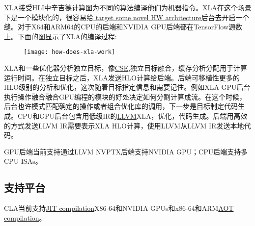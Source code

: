 XLA接受HLI中辛吉德计算图为不同的算法编译他们为机器指令。XLA在这个场景下是一个模块化的，很容易给\href{https://www.tensorflow.org/performance/xla/developing_new_backend}{ target some novel HW architecture}后台去开启一个缝。对于X64和ARM64的CPU的后端和NVIDIA GPU后端都在TensorFlow源数上。下面的图显示了XLA的编译过程:
\begin{center}
\begin{figure}[h]
\texttt{[image: how-does-xla-work]}
\end{figure}
\end{center}
XLA和一些优化器分析独立目标，像\href{https://en.wikipedia.org/wiki/Common_subexpression_elimination}{CSE},独立目标融合，缓存分析分配用于计算运行时间。在独立目标之后，XLA发送HLO计算给后端。后端可移植性更多的HLO级别的分析和优化，这次随着目标指定信息和需要记住。例如XLA GPU后台执行操作融合融合GPU编程的模块的好处决定如何分割计算成流。在这个时候，后台也许模式匹配确定的操作或者组合优化库的调用，下一步是目标制定代码生成。CPU和GPU后台包含用低级IR的\href{http://llvm.org/}{LLVM}XLA，优化，代码生成。后端用高效的方式发送LLVM IR需要表示XLA HLO计算，使用LLVM从LLVM IR发送本地代码。

GPU后端当前支持通过LLVM NVPTX后端支持NVIDIA GPU；CPU后端支持多CPU ISAs。
\subsection{支持平台}
CLA当前支持\href{https://www.tensorflow.org/performance/xla/jit}{JIT compilation}X86-64和NVIDIA GPUs和x86-64和ARM\href{https://www.tensorflow.org/performance/xla/tfcompile}{AOT compilation}。

